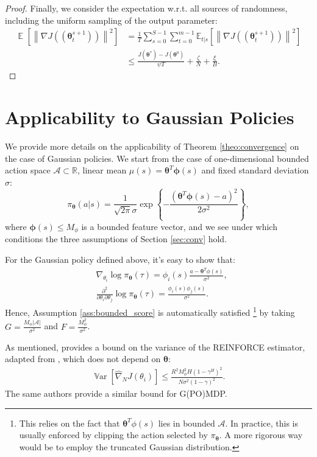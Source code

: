 \documentclass{article}
\makeatletter
\theoremstyle{remark}
\theoremstyle{definition}
\DeclareRobustCommand{\wrt}{w.r.t.\@\xspace}
\DeclareMathOperator*{\EV}{\mathbb{E}}
\DeclareMathOperator*{\Var}{\mathbb{V}ar}
\newcommand{\EVV}[2][\ppvect \in \ppspace]{\EV_{#1}\left[{#2}\right]}
\newcommand{\norm}[2][\infty]{\left\|#2\right\|_{#1}}
\newcommand{\vtheta}{\boldsymbol{\theta}}
\newcommand{\Aspace}{\mathcal{A}}
\newcommand{\vphi}{\boldsymbol{\phi}}
\newcommand{\gradJ}[1]{\nabla J(#1)}
\newcommand{\gradApp}[2]{\widehat{\nabla}_{#2}J(#1)}
\newcommand{\Ets}[2][t]{\mathbb{E}_{#1\vert s}\left[#2\right]}
\newcommand{\GRADLOG}{G}
\newcommand{\HESSLOG}{F}
\makeatother
\begin{document}
\begin{proof}
Finally, we consider the expectation \wrt all sources of randomness, including the uniform sampling of the output parameter:
\begin{align}
\EVV[]{\norm[]{\gradJ{(\vtheta_t^{s+1})}}^2} 
&=\frac{1}{T}\sum_{s=0}^{S-1}\sum_{t=0}^{m-1}\Ets{\norm[]{\gradJ{(\vtheta_t^{s+1})}}^2} \nonumber\\
&\leq
\frac{J(\vtheta^*) - J(\vtheta^0)}{\psi T} + \frac{\zeta}{N} + \frac{\xi}{B} \nonumber.
\end{align}
\end{proof}

\section{Applicability to Gaussian Policies}\label{app:gauss}
We provide more details on the applicability of Theorem \ref{theo:convergence} on the case of Gaussian policies. We start from the case of one-dimensional bounded action space $\mathcal{A}\subset\mathbb{R}$, linear mean $\mu(s) = \vtheta^T\vphi(s)$ and fixed standard deviation $\sigma$:
\[
	\pi_{\vtheta}(a\vert s) = \frac{1}{\sqrt{2\pi}\sigma}\exp\left\{
		-\frac{(\vtheta^T\vphi(s) - a)^2}{2\sigma^2}\right\},
\]
where $\vphi(s)\leq M_{\phi}$ is a bounded feature vector, and we see under which conditions the three assumptions of Section \ref{sec:conv} hold.

\boundedscore*
For the Gaussian policy defined above, it's easy to show that:
\begin{align*}
	&\nabla_{\theta_i}\log\pi_{\vtheta}(\tau) =  \phi_i(s)\frac{a-\vtheta^T\phi(s)}{\sigma^2},\\
	&\frac{\partial^2}{\partial\theta_i\partial\theta_j}\log\pi_{\vtheta}(\tau) = \frac{\phi_i(s)\phi_j(s)}{\sigma^2}.
\end{align*}
Hence, Assumption \ref{ass:bounded_score} is automatically satisfied \footnote{This relies on the fact that $\vtheta^T\phi(s)$ lies in bounded $\Aspace$. In practice, this is usually enforced by clipping the action selected by $\pi_{\vtheta}$. A more rigorous way would be to employ the truncated Gaussian distribution.} by taking $\GRADLOG = \frac{M_{\phi}|\Aspace|}{\sigma^2}$ and $\HESSLOG = \frac{M_{\phi}^2}{\sigma^2}$.
\par
\varreinforce*
As mentioned, \cite{pirotta2013adaptive} provides a bound on the variance of the REINFORCE estimator, adapted from \cite{zhao2011analysis}, which does not depend on $\vtheta$:
\begin{align*}
\Var\left[\gradApp{\theta_i}{N}\right] \leq \frac{R^2M_{\phi}^2H(1-\gamma^H)^2}{N\sigma^2(1-\gamma)^2}.
\end{align*}
The same authors provide a similar bound for G(PO)MDP.
\end{document}
